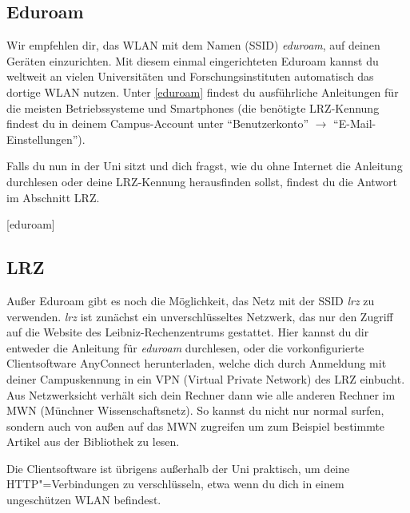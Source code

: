 \subsection*{Eduroam}
Wir empfehlen dir, das WLAN mit dem Namen (SSID) \emph{eduroam}, auf deinen Geräten einzurichten. Mit diesem einmal eingerichteten Eduroam kannst du weltweit an vielen Universitäten und Forschungsinstituten automatisch das dortige WLAN nutzen. Unter \ref{eduroam} findest du ausführliche Anleitungen für die meisten Betriebssysteme und Smart\-phones 
(die benötigte LRZ-Kennung findest du in deinem Campus-Account unter \enquote{Benutzerkonto} $\rightarrow$ \enquote{E-Mail-Einstellungen}).

Falls du nun in der Uni sitzt und dich fragst, wie du ohne Internet
die Anleitung durchlesen oder deine LRZ-Kennung herausfinden sollst, 
findest du die Antwort im Abschnitt LRZ.
\begin{urlList}
	[eduroam]
\end{urlList}

\subsection*{LRZ}
Außer Eduroam gibt es noch die Möglichkeit, das Netz mit der SSID
\emph{lrz} zu verwenden. \emph{lrz} ist zunächst ein unverschlüsseltes
Netzwerk, das nur den Zugriff auf die Website des
Leibniz-Rechen\-zentrums gestattet. Hier kannst du dir entweder die 
Anleitung für \mbox{\emph{eduroam}} durchlesen, oder die
vorkonfigurierte Clientsoftware AnyConnect herunterladen, welche dich
durch Anmeldung mit deiner Campuskennung in ein VPN (Virtual Private
Network) des LRZ einbucht. Aus Netzwerksicht verhält sich dein Rechner
dann wie alle anderen Rechner im MWN (Münchner Wissenschaftsnetz). So
kannst du nicht nur normal surfen, sondern auch von außen auf das
MWN zugreifen um zum Beispiel bestimmte Artikel aus der Bibliothek zu lesen.

Die Clientsoftware ist übrigens außerhalb der Uni praktisch, um deine
HTTP"=Verbindungen zu verschlüsseln, etwa wenn du dich in einem
ungeschützen WLAN befindest.

%
